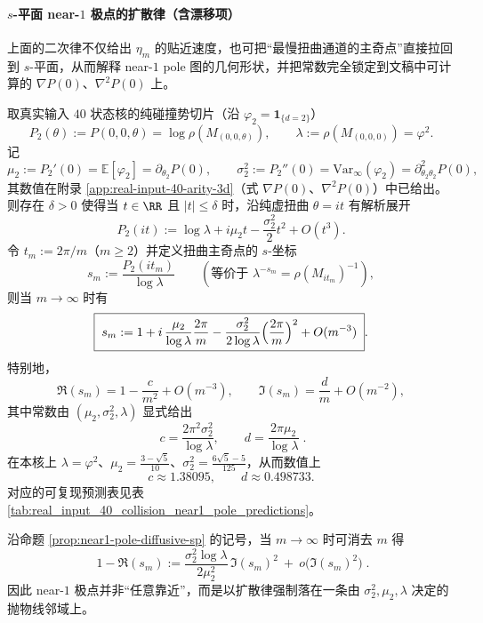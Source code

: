 \paragraph{\texorpdfstring{$s$}{s}-平面 near-\texorpdfstring{$1$}{1} 极点的扩散律（含漂移项）}
上面的二次律不仅给出 \(\eta_m\) 的贴近速度，也可把“最慢扭曲通道的主奇点”直接拉回到
\(s\)-平面，从而解释 near-\(1\) pole 图的几何形状，并把常数完全锁定到文稿中可计算的
\(\nabla P(0)\)、\(\nabla^2P(0)\) 上。

\begin{proposition}\label{prop:near1-pole-diffusive-sp}
取真实输入 \(40\) 状态核的纯碰撞势切片（沿 \(\varphi_2=\mathbf{1}_{\{d=2\}}\)）
\[
P_2(\theta):=P(0,0,\theta)=\log\rho(M_{(0,0,\theta)}),
\qquad \lambda:=\rho(M_{(0,0,0)})=\varphi^2.
\]
记
\[
\mu_2:=P_2'(0)=\mathbb{E}[\varphi_2]=\partial_{\theta_2}P(0),
\qquad
\sigma_2^2:=P_2''(0)=\mathrm{Var}_\infty(\varphi_2)=\partial_{\theta_2\theta_2}^2P(0),
\]
其数值在附录 \ref{app:real-input-40-arity-3d}（式 \(\nabla P(0)\)、\(\nabla^2P(0)\)）中已给出。
则存在 \(\delta>0\) 使得当 \(t\in\RR\) 且 \(|t|\le \delta\) 时，沿纯虚扭曲 \(\theta=it\) 有解析展开
\[
P_2(it)
:=\log\lambda+i\mu_2 t-\frac{\sigma_2^2}{2}t^2+O(t^3).
\]
令 \(t_m:=2\pi/m\)（\(m\ge 2\)）并定义扭曲主奇点的 \(s\)-坐标
\[
s_m:=\frac{P_2(it_m)}{\log\lambda}
\qquad(\text{等价于 } \lambda^{-s_m}=\rho(M_{it_m})^{-1}),
\]
则当 \(m\to\infty\) 时有
\[
\boxed{\;
s_m
:=1+i\,\frac{\mu_2}{\log\lambda}\frac{2\pi}{m}
-\frac{\sigma_2^2}{2\log\lambda}\Bigl(\frac{2\pi}{m}\Bigr)^2
+O(m^{-3})\; }.
\]
特别地，
\[
\Re(s_m)=1-\frac{c}{m^2}+O(m^{-3}),
\qquad
\Im(s_m)=\frac{d}{m}+O(m^{-2}),
\]
其中常数由 \((\mu_2,\sigma_2^2,\lambda)\) 显式给出
\[
\boxed{\;
c=\frac{2\pi^2\sigma_2^2}{\log\lambda},
\qquad
d=\frac{2\pi\mu_2}{\log\lambda}\; }.
\]
在本核上 \(\lambda=\varphi^2\)、\(\mu_2=\frac{3-\sqrt5}{10}\)、\(\sigma_2^2=\frac{6\sqrt5-5}{125}\)，从而数值上
\[
c\approx 1.38095,
\qquad
d\approx 0.498733.
\]
对应的可复现预测表见表 \ref{tab:real_input_40_collision_near1_pole_predictions}。
\end{proposition}

\begin{corollary}\label{cor:near1-pole-parabola}
沿命题 \ref{prop:near1-pole-diffusive-sp} 的记号，当 \(m\to\infty\) 时可消去 \(m\) 得
\[
\boxed{\;
1-\Re(s_m)
:=\frac{\sigma_2^2\log\lambda}{2\mu_2^2}\,\Im(s_m)^2\ +\ o\!\bigl(\Im(s_m)^2\bigr)\; }.
\]
因此 near-\(1\) 极点并非“任意靠近”，而是以扩散律强制落在一条由
\(\sigma_2^2,\mu_2,\lambda\) 决定的抛物线邻域上。
\end{corollary}

